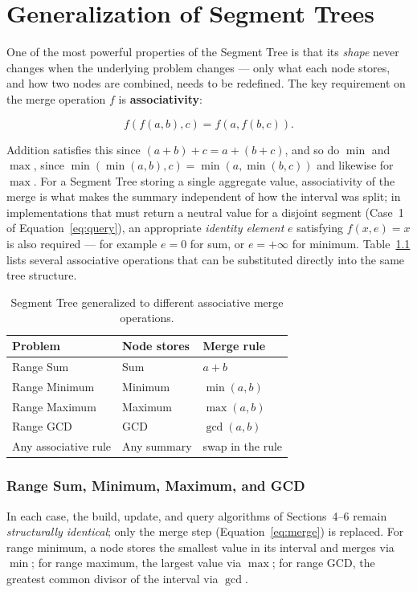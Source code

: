 \documentclass[11pt,open=any,headings=option]{scrreprt}
\begin{document}
\chapter{Generalization of Segment Trees}
\label{sec:generalization}

One of the most powerful properties of the Segment Tree is that its \emph{shape} never changes when the underlying problem changes --- only what each node stores, and how two nodes are combined, needs to be redefined. The key requirement on the merge operation $f$ is \textbf{associativity}:

\begin{equation}
f(f(a,b),c) = f(a,f(b,c)).
\end{equation}

Addition satisfies this since $(a+b)+c = a+(b+c)$, and so do $\min$ and $\max$, since $\min(\min(a,b),c) = \min(a,\min(b,c))$ and likewise for $\max$. For a Segment Tree storing a single aggregate value, associativity of the merge is what makes the summary independent of how the interval was split; in implementations that must return a neutral value for a disjoint segment (Case~1 of Equation~\eqref{eq:query}), an appropriate \emph{identity element} $e$ satisfying $f(x,e) = x$ is also required --- for example $e = 0$ for sum, or $e = +\infty$ for minimum. Table~\ref{tab:generalization} lists several associative operations that can be substituted directly into the same tree structure.

\begin{table}[h]
\centering
\caption{Segment Tree generalized to different associative merge operations.}
\label{tab:generalization}
\begin{tabular}{lll}
\toprule
\textbf{Problem} & \textbf{Node stores} & \textbf{Merge rule} \\
\midrule
Range Sum     & Sum         & $a+b$ \\
Range Minimum & Minimum     & $\min(a,b)$ \\
Range Maximum & Maximum     & $\max(a,b)$ \\
Range GCD     & GCD         & $\gcd(a,b)$ \\
\rowcolor{lightblue!30}
Any associative rule & Any summary & swap in the rule \\
\bottomrule
\end{tabular}
\end{table}

\subsection{Range Sum, Minimum, Maximum, and GCD}
In each case, the build, update, and query algorithms of Sections~4--6 remain \emph{structurally identical}; only the merge step (Equation~\eqref{eq:merge}) is replaced. For range minimum, a node stores the smallest value in its interval and merges via $\min$; for range maximum, the largest value via $\max$; for range GCD, the greatest common divisor of the interval via $\gcd$.
\end{document}
